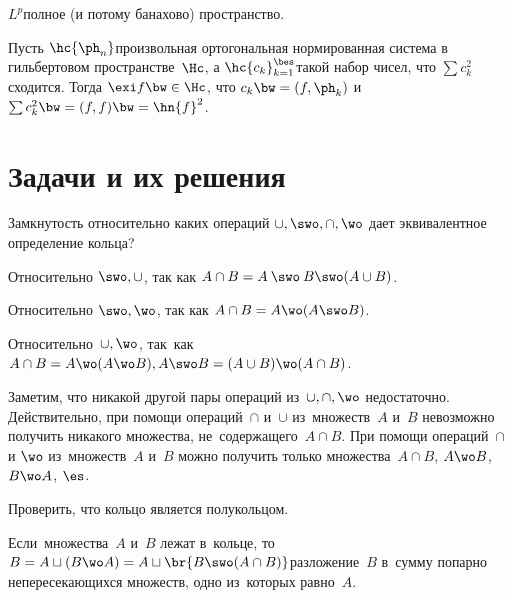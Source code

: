 \documentclass[a4paper,draft]{article}
\begin{document}
\begin{stm}
  $L^p$\т полное (и потому банахово) пространство.
\end{stm}

\begin{theorem}
  Пусть $\hc{\ph_n}$\т произвольная ортогональная нормированная система в гильбертовом пространстве~$\Hc$,
  а $\hc{c_k}_{k=1}^\bes$\т такой набор чисел, что $\sum c_k^2$ сходится.
  Тогда $\exi f\bw\in \Hc$, что $c_k \bw= (f,\ph_k)$ и $\sum c_k^2\bw=(f,f) \bw= \hn{f}^2$.
\end{theorem}

\pagebreak

\section{Задачи и их решения}

\begin{problem}
  Замкнутость относительно каких операций $\cup, \swo, \cap, \wo$ дает эквивалентное определение кольца?
\end{problem}
\begin{solution}
  \begin{items}{-3}
     \item Относительно $\swo, \cup$, так как $A \cap B = A \mathbin{\swo} B \swo (A\cup B)$.
     \item Относительно $\swo, \wo$, так как $A\cap B = A \wo (A \swo B)$.
     \item Относительно~$\cup, \wo$, так~как~$A\cap B = A \wo (A \wo B), A\swo B = (A\cup B) \wo (A\cap B)$.
  \end{items}

  Заметим, что никакой другой пары операций из~$\cup, \cap, \wo$ недостаточно. Действительно,
  при помощи операций~$\cap$ и~$\cup$ из~множеств~$A$  и~$B$ невозможно получить никакого
  множества, не~содержащего~$A\cap B$. При помощи операций~$\cap$ и $\wo$ из~множеств~$A$ и~$B$
  можно получить только множества~$A\cap B$, $A\wo B$, $B\wo A$, $\es$.
\end{solution}

\begin{problem}
  Проверить, что кольцо является полукольцом.
\end{problem}
\begin{solution}
  Если~множества~$A$ и~$B$ лежат в~кольце, то~$B=A\sqcup (B\wo A) =
  A\sqcup \br{B\swo (A\cap B)}$\Т разложение~$B$ в~сумму попарно
  непересекающихся множеств, одно из~которых равно~$A$.
\end{solution}
\end{document}
